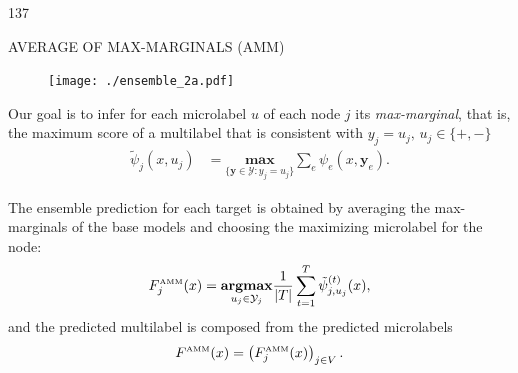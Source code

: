 \documentclass[a4poster]{article}
\newcommand{\Ycal}{\mathcal{Y}}
\newcommand{\yb}{\mathbf{y}}
\newcommand{\argmax}{\textbf{argmax}}
\newcommand{\maximize}{\textbf{max}}
\begin{document}
\begin{textblock}{137}
\begin{multicols}{2}
	\vspace{0.1cm}
	\normalsize{\color{sciorange} AVERAGE OF MAX-MARGINALS (AMM)}\\
	\footnotesize
	\begin{figure}[t]
	\vspace{-4mm}
	\begin{center}
		\texttt{[image: ./ensemble\_2a.pdf]}
	\label{ensemble_3}
	\end{center}
	\end{figure}
	\vspace{-5mm}
	Our goal is to infer for each microlabel $u$ of each node $j$
	its {\em max-marginal}, that is, the maximum score of a multilabel that is consistent with $y_j = u_j, \, u_j\in\{+,-\}$
	\begin{align*}
	{\tilde\psi}_{j}(x,u_j) &= \underset{\{\yb \in \Ycal:y_j= u_j\}}{\mathbf{\maximize}} \sum_e \psi_e(x,\yb_e). \label{eg_global} 
	\end{align*}
	
	The ensemble prediction for each target is obtained by averaging the max-marginals  of the base models and choosing the maximizing microlabel for the node:
	\begin{align*}
	F^{\text{\tiny AMM}}_j(x) = \underset{u_j \in \Ycal_j}{\argmax} \frac{1}{|T|} \sum_{t=1}^{T}{\tilde\psi}_{j,u_j}^{(t)}(x),%
	\end{align*}
	and the predicted multilabel is composed from the predicted  microlabels
	\begin{align*}
	F^{\text{\tiny AMM}}(x) = \left(F^{\text{\tiny AMM}}_j(x)\right)_{j \in V}.
	\end{align*}
	


\end{multicols}
\end{textblock}
\end{document}
